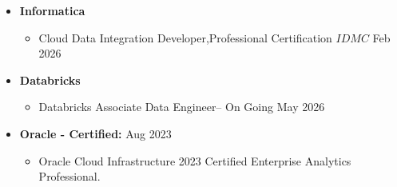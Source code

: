 \begin{itemize}[leftmargin=*]
    \item \textbf{Informatica} 
    \begin{itemize}[leftmargin=1.5em]
        \item Cloud Data Integration Developer,Professional Certification \(IDMC\) \hfill Feb 2026
    \end{itemize}
    
    \item \textbf{Databricks}
    \begin{itemize}[leftmargin=1.5em]
        \item Databricks Associate Data Engineer-- On Going \hfill May 2026
    \end{itemize}
    \item \textbf{Oracle - Certified:} \hfill Aug 2023
    \begin{itemize}[leftmargin=1.5em]
        \item Oracle Cloud Infrastructure 2023 Certified Enterprise Analytics Professional.
    \end{itemize}
\end{itemize}